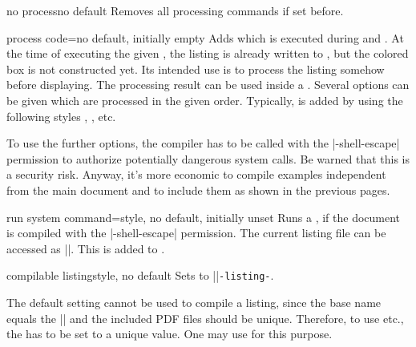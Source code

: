\clearpage


\begin{docTcbKey}[][doc new=2014-11-14]{no process}{}{no default}
  Removes all processing commands if set before.
\end{docTcbKey}

\begin{docTcbKey}[][doc new=2014-11-14]{process code}{=}{no default, initially empty}
  Adds  which is executed during 
  and . At the time of executing the given ,
  the listing is already written to , but
  the colored box is not constructed yet.
  Its intended use is to process the listing somehow before displaying.
  The processing result can be used inside a .
  Several  options can be given which are
  processed in the given order.
  Typically,  is added by using the following styles
  , , etc.
\end{docTcbKey}

\begin{marker}
To use the further options, the compiler has to be called with the
|-shell-escape| permission to authorize potentially dangerous system calls.
Be warned that this is a security risk. Anyway, it's more economic to
compile examples independent from the main document and to include them as
shown in the previous pages.
\end{marker}

\begin{docTcbKey}[][doc new=2014-11-14]{run system command}{=}{style, no default, initially unset}
Runs a , if the document is compiled with the
|-shell-escape| permission.
The current listing file can be accessed as |\filename@area\filename@base\filename@ext|.
This  is added to .
\end{docTcbKey}


\begin{docTcbKey}[][doc new and updated={2014-11-14}{2016-05-27}]{compilable listing}{}{style, no default}
  Sets  to |\jobname|\texttt{-listing-}.
  \begin{marker}
  The default  setting cannot be used to compile
  a listing, since the base name equals the |\jobname| and the included PDF
  files should be unique.
  Therefore, to use  etc., the 
  has to be set to a unique value.
  One may use  for this purpose.
  \end{marker}
\end{docTcbKey}


